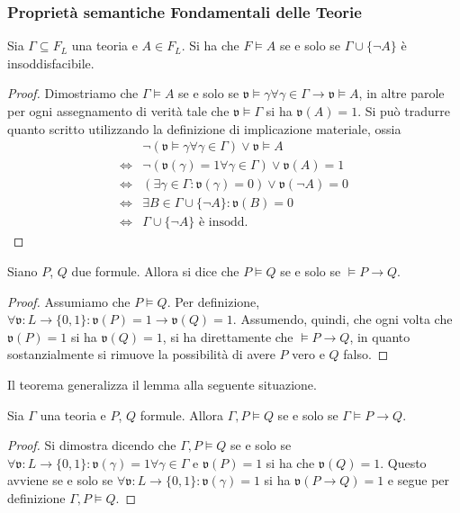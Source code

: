 \subsubsection{Proprietà semantiche Fondamentali delle Teorie}

\begin{lem}
Sia $\Gamma \subseteq F_L$ una teoria e $A \in F_L$. Si 
ha che $F \models A$ se e solo se $\Gamma \cup \{\neg A \}$ è insoddisfacibile. 
\end{lem}

\begin{proof}
Dimostriamo che $\Gamma \models A$ se e solo se 
$\mathfrak{v} \models \gamma \forall \gamma \in \Gamma \rightarrow \mathfrak{v}\models A$, 
in altre parole per ogni assegnamento di verità tale che $\mathfrak{v} \models \Gamma$ 
si ha $\mathfrak{v}(A) = 1$.
Si può tradurre quanto scritto utilizzando la definizione di implicazione materiale, 
ossia 
\begin{align*}
  &\neg (\mathfrak{v} \models \gamma \forall \gamma \in \Gamma) \lor \mathfrak{v}\models A \\
  \iff &\neg (\mathfrak{v}(\gamma) = 1 \forall \gamma \in \Gamma) \lor \mathfrak{v}(A) = 1\\
  \iff & (\exists \gamma \in \Gamma : \mathfrak{v}(\gamma) = 0) \lor \mathfrak{v}(\neg A) = 0 \\
  \iff & \exists B \in \Gamma \cup \{\neg A\}: \mathfrak{v}(B) = 0  \\
  \iff & \Gamma \cup \{\neg A\} \text{ è insodd.}
\end{align*}
\end{proof}

\begin{lem} Siano $P$, $Q$ due formule. Allora 
si dice che $P \models Q$ se e solo se $\models P \rightarrow Q$. 
\end{lem}
\begin{proof}
Assumiamo che $P \models Q$. Per definizione, 
$\forall \mathfrak{v}: L \rightarrow \{0,1\}:\mathfrak{v}(P) = 1 \rightarrow \mathfrak{v}(Q) = 1$. 
Assumendo, quindi, che ogni volta che $\mathfrak{v}(P) = 1$ si ha $\mathfrak{v}(Q) = 1$, 
si ha direttamente che $\models P\rightarrow Q$, in quanto sostanzialmente 
si rimuove la possibilità di avere $P$ vero e $Q$ falso.
\end{proof}

Il teorema generalizza il lemma alla seguente situazione. 
\begin{teo}
Sia $\Gamma$ una teoria 
e $P$, $Q$ formule. Allora $\Gamma,P \models Q$ se e solo se
$\Gamma \models P \rightarrow Q$. 
\end{teo}
\begin{proof}
Si dimostra dicendo che $\Gamma, P \models Q$ se e solo se 
$\forall \mathfrak{v}: L \rightarrow \{0,1\}: \mathfrak{v}(\gamma) = 1 \forall \gamma \in \Gamma$ e 
$\mathfrak{v}(P) = 1$ si ha che $\mathfrak{v}(Q) = 1$. Questo avviene se e solo se 
$\forall \mathfrak{v}:L \rightarrow \{0,1\} : \mathfrak{v}(\gamma) = 1$ si ha $\mathfrak{v}(P \rightarrow Q) = 1$ 
e segue per definizione $\Gamma, P \models Q$. 
\end{proof}

